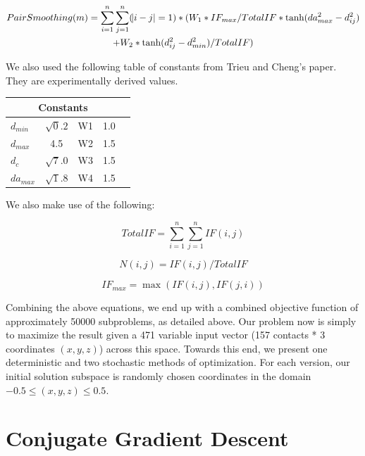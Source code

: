 \documentclass{article}
\begin{document}
\begin{multline}
      PairSmoothing(m) = \sum_{i=1}^{n} \sum_{j=1}^{n} (\abs{i-j}=1) * (W_1 * IF_{max} / TotalIF * \tanh(da_{max}^2-d_{ij}^2) \\+ W_2 * \tanh(d_{ij}^2-d_{min}^2) / TotalIF)
\end{multline}

We also used the following table of constants from Trieu and Cheng's paper.  They are experimentally derived values.

\begin{center}
\begin{tabular}{|l|c|c|c|r|}
\multicolumn{4}{c}{Constants} \\
    \hline
    $d_{min}$ & $\sqrt 0.2$ & W1 & 1.0           \\ \hline
    $d_{max}$ & 4.5  & W2 & 1.5      \\ \hline
    $d_{c}$ & $\sqrt 7.0$  & W3 & 1.5            \\ \hline
    $da_{max}$ & $\sqrt 1.8$  & W4 & 1.5     \\ \hline
    \end{tabular}
\end{center}

We also make use of the following:

\begin{equation}
      TotalIF = \sum_{i=1}^{n} \sum_{j=1}^{n} IF(i,j)
\end{equation}

\begin{equation}
      N(i,j) = IF(i,j)/TotalIF
\end{equation}

\begin{equation}
      IF_{max} = \max(IF(i,j),IF(j,i))
\end{equation}

Combining the above equations, we end up with a combined objective function of approximately 50000 subproblems, as detailed above.  Our problem now is simply to maximize the result given a 471 variable input vector (157 contacts * 3 coordinates $(x, y, z)$) across this space.  Towards this end, we present one deterministic and two stochastic methods of optimization.  For each version, our initial solution subspace is randomly chosen coordinates in the domain $-0.5 \leq (x, y, z) \leq 0.5$. 

\section{Conjugate Gradient Descent}
\end{document}
